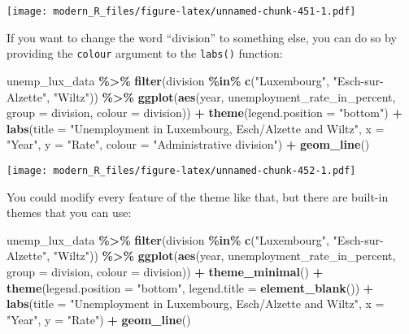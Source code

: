 \documentclass[
]{article}
\newenvironment{Shaded}{\begin{snugshade}}{\end{snugshade}}
\newcommand{\DataTypeTok}[1]{\textcolor[rgb]{0.13,0.29,0.53}{#1}}
\newcommand{\KeywordTok}[1]{\textcolor[rgb]{0.13,0.29,0.53}{\textbf{#1}}}
\newcommand{\NormalTok}[1]{#1}
\newcommand{\OperatorTok}[1]{\textcolor[rgb]{0.81,0.36,0.00}{\textbf{#1}}}
\newcommand{\StringTok}[1]{\textcolor[rgb]{0.31,0.60,0.02}{#1}}
\begin{document}
\texttt{[image: modern\_R\_files/figure-latex/unnamed-chunk-451-1.pdf]}

If you want to change the word ``division'' to something else, you can do so by providing the \texttt{colour} argument
to the \texttt{labs()} function:

\begin{Shaded}
\begin{Highlighting}[]
\NormalTok{unemp\_lux\_data }\OperatorTok{\%\textgreater{}\%}
\StringTok{  }\KeywordTok{filter}\NormalTok{(division }\OperatorTok{\%in\%}\StringTok{ }\KeywordTok{c}\NormalTok{(}\StringTok{"Luxembourg"}\NormalTok{, }\StringTok{"Esch{-}sur{-}Alzette"}\NormalTok{, }\StringTok{"Wiltz"}\NormalTok{)) }\OperatorTok{\%\textgreater{}\%}
\StringTok{  }\KeywordTok{ggplot}\NormalTok{(}\KeywordTok{aes}\NormalTok{(year, unemployment\_rate\_in\_percent, }\DataTypeTok{group =}\NormalTok{ division, }\DataTypeTok{colour =}\NormalTok{ division)) }\OperatorTok{+}
\StringTok{  }\KeywordTok{theme}\NormalTok{(}\DataTypeTok{legend.position =} \StringTok{"bottom"}\NormalTok{) }\OperatorTok{+}
\StringTok{  }\KeywordTok{labs}\NormalTok{(}\DataTypeTok{title =} \StringTok{"Unemployment in Luxembourg, Esch/Alzette and Wiltz"}\NormalTok{, }\DataTypeTok{x =} \StringTok{"Year"}\NormalTok{, }\DataTypeTok{y =} \StringTok{"Rate"}\NormalTok{, }\DataTypeTok{colour =} \StringTok{"Administrative division"}\NormalTok{) }\OperatorTok{+}
\StringTok{  }\KeywordTok{geom\_line}\NormalTok{()}
\end{Highlighting}
\end{Shaded}

\texttt{[image: modern\_R\_files/figure-latex/unnamed-chunk-452-1.pdf]}

You could modify every feature of the theme like that, but there are built-in themes that you can use:

\begin{Shaded}
\begin{Highlighting}[]
\NormalTok{unemp\_lux\_data }\OperatorTok{\%\textgreater{}\%}
\StringTok{  }\KeywordTok{filter}\NormalTok{(division }\OperatorTok{\%in\%}\StringTok{ }\KeywordTok{c}\NormalTok{(}\StringTok{"Luxembourg"}\NormalTok{, }\StringTok{"Esch{-}sur{-}Alzette"}\NormalTok{, }\StringTok{"Wiltz"}\NormalTok{)) }\OperatorTok{\%\textgreater{}\%}
\StringTok{  }\KeywordTok{ggplot}\NormalTok{(}\KeywordTok{aes}\NormalTok{(year, unemployment\_rate\_in\_percent, }\DataTypeTok{group =}\NormalTok{ division, }\DataTypeTok{colour =}\NormalTok{ division)) }\OperatorTok{+}
\StringTok{  }\KeywordTok{theme\_minimal}\NormalTok{() }\OperatorTok{+}
\StringTok{  }\KeywordTok{theme}\NormalTok{(}\DataTypeTok{legend.position =} \StringTok{"bottom"}\NormalTok{, }\DataTypeTok{legend.title =} \KeywordTok{element\_blank}\NormalTok{()) }\OperatorTok{+}
\StringTok{  }\KeywordTok{labs}\NormalTok{(}\DataTypeTok{title =} \StringTok{"Unemployment in Luxembourg, Esch/Alzette and Wiltz"}\NormalTok{, }\DataTypeTok{x =} \StringTok{"Year"}\NormalTok{, }\DataTypeTok{y =} \StringTok{"Rate"}\NormalTok{) }\OperatorTok{+}
\StringTok{  }\KeywordTok{geom\_line}\NormalTok{()}
\end{Highlighting}
\end{Shaded}
\end{document}

